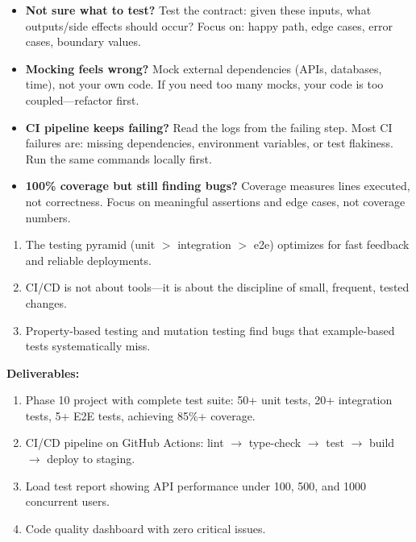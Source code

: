 \documentclass[11pt, a4paper, oneside]{report}
\newcommand{\arrow}{$\rightarrow$}
\begin{document}
\begin{stuckbox}
\begin{itemize}[leftmargin=*]
\item \textbf{Not sure what to test?} Test the contract: given these inputs, what outputs/side effects should occur? Focus on: happy path, edge cases, error cases, boundary values.
\item \textbf{Mocking feels wrong?} Mock external dependencies (APIs, databases, time), not your own code. If you need too many mocks, your code is too coupled---refactor first.
\item \textbf{CI pipeline keeps failing?} Read the logs from the failing step. Most CI failures are: missing dependencies, environment variables, or test flakiness. Run the same commands locally first.
\item \textbf{100\% coverage but still finding bugs?} Coverage measures lines executed, not correctness. Focus on meaningful assertions and edge cases, not coverage numbers.
\end{itemize}
\end{stuckbox}


\begin{takeawaybox}
\begin{enumerate}[leftmargin=*]
\item The testing pyramid (unit $>$ integration $>$ e2e) optimizes for fast feedback and reliable deployments.
\item CI/CD is not about tools---it is about the discipline of small, frequent, tested changes.
\item Property-based testing and mutation testing find bugs that example-based tests systematically miss.
\end{enumerate}
\end{takeawaybox}

\begin{milestonebox}
\textbf{Deliverables:}
\begin{enumerate}[leftmargin=*]
\item Phase 10 project with complete test suite: 50+ unit tests, 20+ integration tests, 5+ E2E tests, achieving 85\%+ coverage.
\item CI/CD pipeline on GitHub Actions: lint \arrow{} type-check \arrow{} test \arrow{} build \arrow{} deploy to staging.
\item Load test report showing API performance under 100, 500, and 1000 concurrent users.
\item Code quality dashboard with zero critical issues.
\end{enumerate}
\end{milestonebox}
\end{document}
